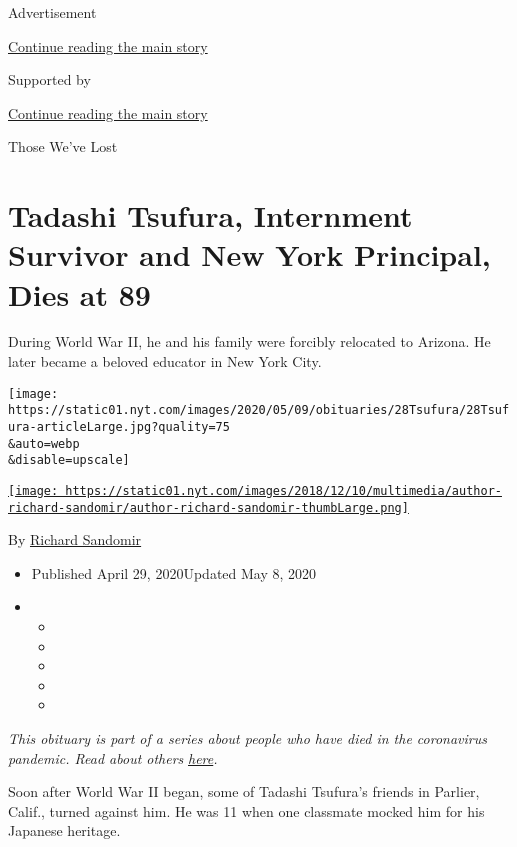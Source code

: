 Advertisement

\protect\hyperlink{after-top}{Continue reading the main story}

Supported by

\protect\hyperlink{after-sponsor}{Continue reading the main story}

Those We've Lost

\hypertarget{tadashi-tsufura-internment-survivor-and-new-york-principal-dies-at-89}{%
\section{Tadashi Tsufura, Internment Survivor and New York Principal,
Dies at
89}\label{tadashi-tsufura-internment-survivor-and-new-york-principal-dies-at-89}}

During World War II, he and his family were forcibly relocated to
Arizona. He later became a beloved educator in New York City.

\texttt{[image: https://static01.nyt.com/images/2020/05/09/obituaries/28Tsufura/28Tsufura-articleLarge.jpg?quality=75\\\&auto=webp\\\&disable=upscale]}

\href{https://www.nytimes.com/by/richard-sandomir}{\texttt{[image: https://static01.nyt.com/images/2018/12/10/multimedia/author-richard-sandomir/author-richard-sandomir-thumbLarge.png]}}

By \href{https://www.nytimes.com/by/richard-sandomir}{Richard Sandomir}

\begin{itemize}
\item
  Published April 29, 2020Updated May 8, 2020
\item
  \begin{itemize}
  \item
  \item
  \item
  \item
  \item
  \end{itemize}
\end{itemize}

\emph{This obituary is part of a series about people who have died in
the coronavirus pandemic. Read about others}
\href{https://www.nytimes.com/series/people-who-have-died-of-the-coronavirus}{\emph{here}}\emph{.}

Soon after World War II began, some of Tadashi Tsufura's friends in
Parlier, Calif., turned against him. He was 11 when one classmate mocked
him for his Japanese heritage.

